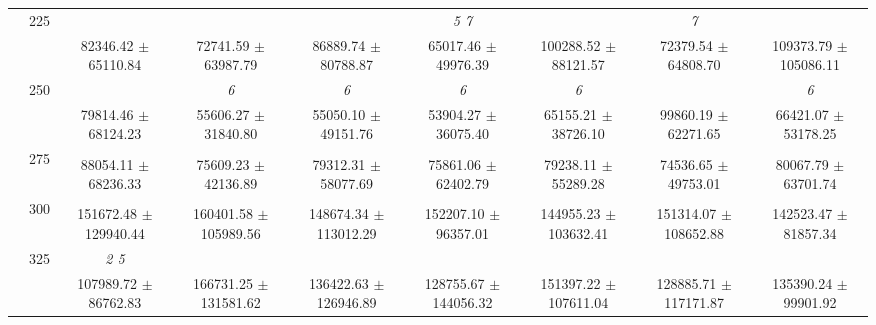 \begin{table}[h]
{\begin{tabular}{
        ccccccccc}
 & \multirow{2}{*}{225}& \cellcolor[HTML]{EFEFEF} & \cellcolor[HTML]{EFEFEF} & \cellcolor[HTML]{EFEFEF} & \cellcolor[HTML]{EFEFEF} \textit{ 5 7 }& \cellcolor[HTML]{EFEFEF} & \cellcolor[HTML]{EFEFEF} \textit{ 7 }& \cellcolor[HTML]{EFEFEF}  \\ 
 & & \cellcolor[HTML]{EFEFEF} 82346.42 $\pm$ 65110.84& \cellcolor[HTML]{EFEFEF} 72741.59 $\pm$ 63987.79& \cellcolor[HTML]{EFEFEF} 86889.74 $\pm$ 80788.87& \cellcolor[HTML]{EFEFEF} 65017.46 $\pm$ 49976.39& \cellcolor[HTML]{EFEFEF} 100288.52 $\pm$ 88121.57& \cellcolor[HTML]{EFEFEF} 72379.54 $\pm$ 64808.70& \cellcolor[HTML]{EFEFEF} 109373.79 $\pm$ 105086.11 \\ 
 & \multirow{2}{*}{250}& & \textit{ 6 }& \textit{ 6 }& \textit{ 6 }& \textit{ 6 }& & \textit{ 6 } \\ 
 & & 79814.46 $\pm$ 68124.23& 55606.27 $\pm$ 31840.80& 55050.10 $\pm$ 49151.76& 53904.27 $\pm$ 36075.40& 65155.21 $\pm$ 38726.10& 99860.19 $\pm$ 62271.65& 66421.07 $\pm$ 53178.25 \\ 
 & \multirow{2}{*}{275}& \cellcolor[HTML]{EFEFEF} & \cellcolor[HTML]{EFEFEF} & \cellcolor[HTML]{EFEFEF} & \cellcolor[HTML]{EFEFEF} & \cellcolor[HTML]{EFEFEF} & \cellcolor[HTML]{EFEFEF} & \cellcolor[HTML]{EFEFEF}  \\ 
 & & \cellcolor[HTML]{EFEFEF} 88054.11 $\pm$ 68236.33& \cellcolor[HTML]{EFEFEF} 75609.23 $\pm$ 42136.89& \cellcolor[HTML]{EFEFEF} 79312.31 $\pm$ 58077.69& \cellcolor[HTML]{EFEFEF} 75861.06 $\pm$ 62402.79& \cellcolor[HTML]{EFEFEF} 79238.11 $\pm$ 55289.28& \cellcolor[HTML]{EFEFEF} 74536.65 $\pm$ 49753.01& \cellcolor[HTML]{EFEFEF} 80067.79 $\pm$ 63701.74 \\ 
 & \multirow{2}{*}{300}& & & & & & &  \\ 
 & & 151672.48 $\pm$ 129940.44& 160401.58 $\pm$ 105989.56& 148674.34 $\pm$ 113012.29& 152207.10 $\pm$ 96357.01& 144955.23 $\pm$ 103632.41& 151314.07 $\pm$ 108652.88& 142523.47 $\pm$ 81857.34 \\ 
 & \multirow{2}{*}{325}& \cellcolor[HTML]{EFEFEF} \textit{ 2 5 }& \cellcolor[HTML]{EFEFEF} & \cellcolor[HTML]{EFEFEF} & \cellcolor[HTML]{EFEFEF} & \cellcolor[HTML]{EFEFEF} & \cellcolor[HTML]{EFEFEF} & \cellcolor[HTML]{EFEFEF}  \\ 
 & & \cellcolor[HTML]{EFEFEF} 107989.72 $\pm$ 86762.83& \cellcolor[HTML]{EFEFEF} 166731.25 $\pm$ 131581.62& \cellcolor[HTML]{EFEFEF} 136422.63 $\pm$ 126946.89& \cellcolor[HTML]{EFEFEF} 128755.67 $\pm$ 144056.32& \cellcolor[HTML]{EFEFEF} 151397.22 $\pm$ 107611.04& \cellcolor[HTML]{EFEFEF} 128885.71 $\pm$ 117171.87& \cellcolor[HTML]{EFEFEF} 135390.24 $\pm$ 99901.92 \\ 

\end{tabular}}
\end{table}
